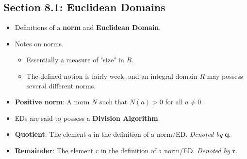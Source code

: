 \documentclass[../notes.tex]{subfiles}
\begin{document}
\subsection*{Section 8.1: Euclidean Domains}
\begin{itemize}
    \item Definitions of a \textbf{norm} and \textbf{Euclidean Domain}.
    \item Notes on norms.
    \begin{itemize}
        \item Essentially a measure of "size" in $R$.
        \item The defined notion is fairly week, and an integral domain $R$ may possess several different norms.
    \end{itemize}
    \item \textbf{Positive norm}: A norm $N$ such that $N(a)>0$ for all $a\neq 0$.
    \item EDs are said to possess a \textbf{Division Algorithm}.
    \item \textbf{Quotient}: The element $q$ in the definition of a norm/ED. \emph{Denoted by} $\bm{q}$.
    \item \textbf{Remainder}: The element $r$ in the definition of a norm/ED. \emph{Denoted by} $\bm{r}$.
\end{itemize}
\end{document}
